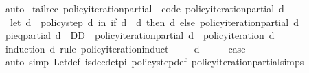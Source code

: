 \begin{isabellebody}
\ auto%
\endisatagproof
{\isafoldproof}%
%
\isadelimproof
%
\endisadelimproof
%
\isadelimdocument
%
\endisadelimdocument
%
\isatagdocument
%
\isamarkuptrue%
%
\endisatagdocument
{\isafolddocument}%
%
\isadelimdocument
%
\endisadelimdocument
{}\isamarkupfalse%
\ {\isacharparenleft}{\kern0pt}tailrec{\isacharparenright}{\kern0pt}\ policy{\isacharunderscore}{\kern0pt}iteration{\isacharunderscore}{\kern0pt}partial\ \ {\isacharbrackleft}{\kern0pt}code{\isacharbrackright}{\kern0pt}{\isacharcolon}{\kern0pt}\ {\isachardoublequoteopen}policy{\isacharunderscore}{\kern0pt}iteration{\isacharunderscore}{\kern0pt}partial\ d\ {\isacharequal}{\kern0pt}\ \isanewline
\ \ {\isacharparenleft}{\kern0pt}let\ d{\isacharprime}{\kern0pt}\ {\isacharequal}{\kern0pt}\ policy{\isacharunderscore}{\kern0pt}step\ d\ in\ if\ d\ {\isacharequal}{\kern0pt}\ d{\isacharprime}{\kern0pt}\ then\ d\ else\ policy{\isacharunderscore}{\kern0pt}iteration{\isacharunderscore}{\kern0pt}partial\ d{\isacharprime}{\kern0pt}{\isacharparenright}{\kern0pt}{\isachardoublequoteclose}\isanewline
\isanewline
{}\isamarkupfalse%
\ pi{\isacharunderscore}{\kern0pt}eq{\isacharunderscore}{\kern0pt}partial{\isacharcolon}{\kern0pt}\ {\isachardoublequoteopen}d\ {\isasymin}\ D\isactrlsub D\ {\isasymLongrightarrow}\ policy{\isacharunderscore}{\kern0pt}iteration{\isacharunderscore}{\kern0pt}partial\ d\ {\isacharequal}{\kern0pt}\ policy{\isacharunderscore}{\kern0pt}iteration\ d{\isachardoublequoteclose}\isanewline
%
\isadelimproof
%
\endisadelimproof
%
\isatagproof
{}\isamarkupfalse%
\ {\isacharparenleft}{\kern0pt}induction\ d\ rule{\isacharcolon}{\kern0pt}\ policy{\isacharunderscore}{\kern0pt}iteration{\isachardot}{\kern0pt}induct{\isacharparenright}{\kern0pt}\isanewline
\ \ \isamarkupfalse%
\ {\isacharparenleft}{\kern0pt}{}\ d{\isacharparenright}{\kern0pt}\isanewline
\ \ \isamarkupfalse%
\ \isamarkupfalse%
\ {\isacharquery}{\kern0pt}case\isanewline
\ \ \ \ \isamarkupfalse%
\ {\isacharparenleft}{\kern0pt}auto\ simp{\isacharcolon}{\kern0pt}\ Let{\isacharunderscore}{\kern0pt}def\ is{\isacharunderscore}{\kern0pt}dec{\isacharunderscore}{\kern0pt}det{\isacharunderscore}{\kern0pt}pi\ policy{\isacharunderscore}{\kern0pt}step{\isacharunderscore}{\kern0pt}def\ policy{\isacharunderscore}{\kern0pt}iteration{\isacharunderscore}{\kern0pt}partial{\isachardot}{\kern0pt}simps{\isacharparenright}{\kern0pt}\isanewline
{}\isamarkupfalse%

\end{isabellebody}

